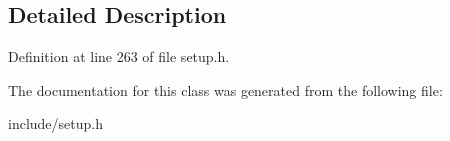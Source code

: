 \subsection{Detailed Description}


Definition at line 263 of file setup.\-h.



The documentation for this class was generated from the following file\-:\begin{DoxyCompactItemize}
\item 
include/setup.\-h\end{DoxyCompactItemize}
